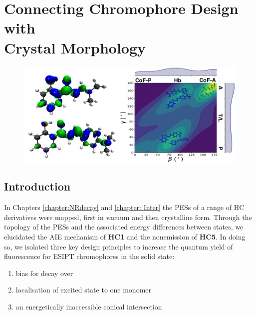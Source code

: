 \chapter[Connecting Chromophore Design with Crystal Morphology]{Connecting Chromophore Design with\\ Crystal Morphology}
\label{chapter: Connecting}
\begin{figure}[H]
\centering
  \includegraphics[width=0.7\linewidth]{5ConnectingCrystalStructure/3toc.pdf}
\end{figure}
\section{Introduction}\label{section: Connecting_Introduction}

In Chapters \ref{chapter:NRdecay} and \ref{chapter: Inter} the \acp{PES} of a range of \ac{HC} derivatives were mapped, first in vacuum and then crystalline form. Through the topology of the \acp{PES} and the associated energy differences between states, we elucidated the AIE mechanism of \textbf{HC1} and the nonemission of \textbf{HC5}. In doing so, we isolated three key design principles to increase the quantum yield of fluorescence for ESIPT chromophores in the solid state:
\begin{enumerate}
    \item bias for \Kstar{} decay over \Estar{}
    \item localisation of excited state to one monomer 
    \item an energetically inaccessible conical intersection
\end{enumerate}

